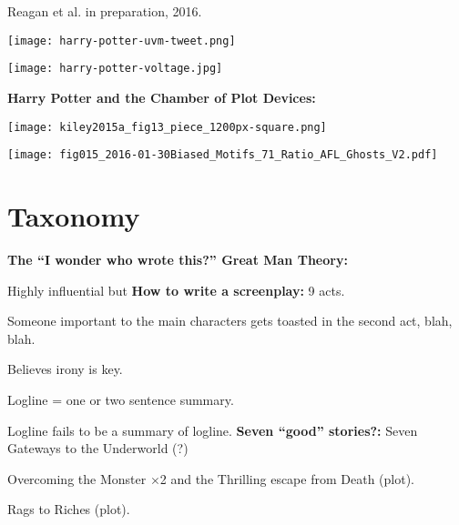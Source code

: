     \small
    Reagan et al. in preparation, 2016.
    
\begin{marginfigure}
  \texttt{[image: harry-potter-uvm-tweet.png]}
\end{marginfigure}
  
\begin{marginfigure}
  \texttt{[image: harry-potter-voltage.jpg]}
\end{marginfigure}
  \textbf{Harry Potter and the Chamber of Plot Devices:}
    
\begin{marginfigure}
  \texttt{[image: kiley2015a\_fig13\_piece\_1200px-square.png]}
\end{marginfigure}
  
    
\begin{marginfigure}
  \texttt{[image: fig015\_2016-01-30Biased\_Motifs\_71\_Ratio\_AFL\_Ghosts\_V2.pdf]}
\end{marginfigure}
\section{Taxonomy}
  \textbf{The ``I wonder who wrote this?'' Great Man Theory:}
    \bigskip
  
    Highly influential but     
  \textbf{How to write a screenplay:}
      9 acts.
     
      Someone important to the main characters gets
      toasted in the second act, blah, blah.
     
      Believes irony is key.
     
      Logline = one or two sentence summary.
     
      Logline fails to be a summary of logline.
  \textbf{Seven ``good'' stories?:}
      Seven Gateways to the Underworld (?)
    
      Overcoming the Monster $\times$2 and the Thrilling escape from
      Death (plot).
    
      Rags to Riches (plot).
    
